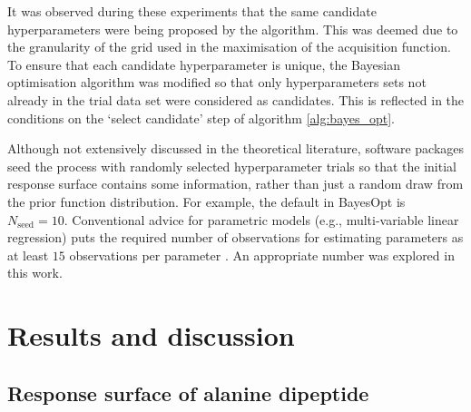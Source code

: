 It was observed during these experiments that the same candidate hyperparameters were being proposed by the algorithm. This was deemed due to the granularity of the grid used in the maximisation of the acquisition function. To ensure that each candidate hyperparameter is unique, the Bayesian optimisation algorithm was modified so that only  hyperparameters sets not already in the trial data set were considered as candidates. This is reflected in the conditions on the `select candidate' step of algorithm \ref{alg:bayes_opt}.

Although not extensively discussed in the theoretical literature, software packages seed the process with randomly selected hyperparameter trials so that the initial response surface contains some information, rather than just a random draw from the prior function distribution. For example, the default in BayesOpt \cite{martinez-cantinBayesOptBayesianOptimization2014} is $N_{\mathrm{seed}} = 10$. Conventional advice  for parametric models (e.g., multi-variable linear regression) puts the required number of observations for estimating parameters as at least $15$ observations per parameter \cite{harrelRegressionModelingStrategies2015}. An appropriate number was explored in this work. 


\section{Results and discussion}\label{sec:msm_results}

\subsection{Response surface of alanine dipeptide}\label{sec:ala_rsm}

